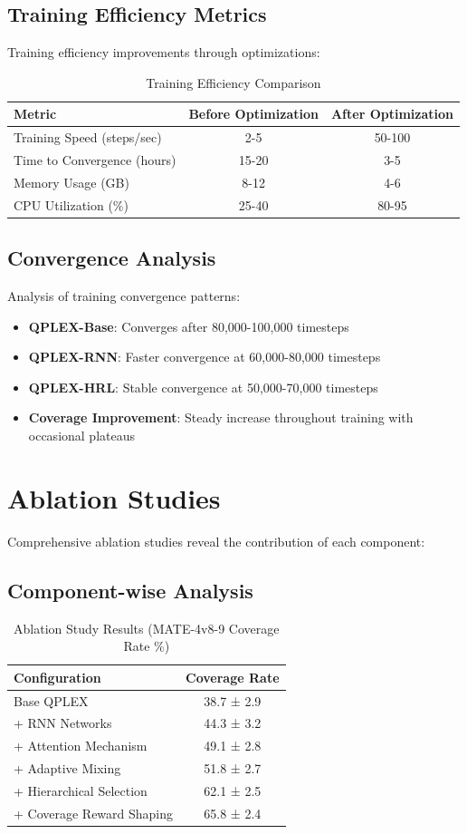 \documentclass[12pt,a4paper]{report}
\begin{document}
\subsection{Training Efficiency Metrics}
Training efficiency improvements through optimizations:

\begin{table}[H]
\centering
\caption{Training Efficiency Comparison}
\begin{tabular}{lcc}
\toprule
Metric & Before Optimization & After Optimization \\
\midrule
Training Speed (steps/sec) & 2-5 & 50-100 \\
Time to Convergence (hours) & 15-20 & 3-5 \\
Memory Usage (GB) & 8-12 & 4-6 \\
CPU Utilization (\%) & 25-40 & 80-95 \\
\bottomrule
\end{tabular}
\end{table}

\subsection{Convergence Analysis}
Analysis of training convergence patterns:

\begin{itemize}
\item \textbf{QPLEX-Base}: Converges after 80,000-100,000 timesteps
\item \textbf{QPLEX-RNN}: Faster convergence at 60,000-80,000 timesteps
\item \textbf{QPLEX-HRL}: Stable convergence at 50,000-70,000 timesteps
\item \textbf{Coverage Improvement}: Steady increase throughout training with occasional plateaus
\end{itemize}

\section{Ablation Studies}
Comprehensive ablation studies reveal the contribution of each component:

\subsection{Component-wise Analysis}
\begin{table}[H]
\centering
\caption{Ablation Study Results (MATE-4v8-9 Coverage Rate \%)}
\begin{tabular}{lc}
\toprule
Configuration & Coverage Rate \\
\midrule
Base QPLEX & 38.7 ± 2.9 \\
+ RNN Networks & 44.3 ± 3.2 \\
+ Attention Mechanism & 49.1 ± 2.8 \\
+ Adaptive Mixing & 51.8 ± 2.7 \\
+ Hierarchical Selection & 62.1 ± 2.5 \\
+ Coverage Reward Shaping & 65.8 ± 2.4 \\
\bottomrule
\end{tabular}
\end{table}
\end{document}
